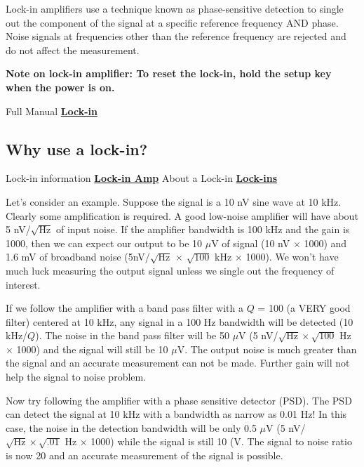 \documentclass{../lab}
\begin{document}
Lock-in amplifiers use a technique known as phase-sensitive detection to single out the component of the signal at a specific reference frequency AND phase. Noise signals at frequencies other than the reference frequency are rejected and do not affect the measurement.

\textbf{Note on lock-in amplifier: To reset the lock-in, hold the setup key when the power is on.}

Full Manual \href{http://physics111.lib.berkeley.edu/Physics111/Equipment\_Manuals/SRS/SR830m.pdf}{\textbf{Lock-in}}

\subsection{Why use a lock-in?}

Lock-in information \href{http://physics111.lib.berkeley.edu/Physics111/Reprints/NMR/Lock-in-Amp.pdf}{\textbf{Lock-in Amp}} About a Lock-in \href{http://physics111.lib.berkeley.edu/Physics111/Reprints/NMR/About-Lock-Ins.pdf}{\textbf{Lock-ins}}

Let's consider an example. Suppose the signal is a 10 nV sine wave at 10 kHz. Clearly some amplification is required. A good low-noise amplifier will have about 5 nV/$\sqrt{\text{Hz}}$ of input noise. If the amplifier bandwidth is 100 kHz and the gain is 1000, then we can expect our output to be 10 $\mu$V of signal (10 nV $\times$ 1000) and 1.6 mV of broadband noise (5nV/$\sqrt{\text{Hz}}$ $\times$ $\sqrt{100}$ kHz $\times$ 1000). We won't have much luck measuring the output signal unless we single out the frequency of interest.

If we follow the amplifier with a band pass filter with a $Q$ = 100 (a VERY good filter) centered at 10 kHz, any signal in a 100 Hz bandwidth will be detected (10 kHz/$Q$). The noise in the band pass filter will be 50 $\mu$V (5 nV/$\sqrt{\text{Hz}} \times \sqrt{100}$ Hz $\times$ 1000) and the signal will still be 10 $\mu$V. The output noise is much greater than the signal and an accurate measurement can not be made. Further gain will not help the signal to noise problem.

Now try following the amplifier with a phase sensitive detector (PSD). The PSD can detect the signal at 10 kHz with a bandwidth as narrow as 0.01 Hz! In this case, the noise in the detection bandwidth will be only 0.5 $\mu$V (5 nV/$\sqrt{\text{Hz}} \times \sqrt{.01}$ Hz $\times$ 1000) while the signal is still 10 (V. The signal to noise ratio is now 20 and an accurate measurement of the signal is possible.
\end{document}
